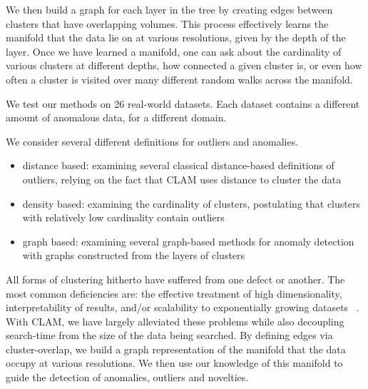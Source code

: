 We then build a graph for each layer in the tree by creating edges between clusters that have overlapping volumes.
This process effectively learns the manifold that the data lie on at various resolutions, given by the depth of the layer.
Once we have learned a manifold, one can ask about the cardinality of various clusters at different depths, how connected a given cluster is, or even how often a cluster is visited over many different random walks across the manifold.

We test our methods on 26 real-world datasets. 
Each dataset contains a different amount of anomalous data, for a different domain.

We consider several different definitions for outliers and anomalies.

\begin{itemize}
    \item distance based: examining several classical distance-based definitions of outliers, relying on the fact that CLAM uses distance to cluster the data
    \item density based: examining the cardinality of clusters, postulating that clusters with relatively low cardinality contain outliers
    \item graph based: examining several graph-based methods for anomaly detection with graphs constructed from the layers of clusters
\end{itemize}

All forms of clustering hitherto have suffered from one defect or another.
The most common deficiencies are: the effective treatment of high dimensionality, interpretability of results, and/or scalability to exponentially growing datasets ~\cite{rakesh_agrawal_automatic_1998}.
With CLAM, we have largely alleviated these problems while also decoupling search-time from the size of the data being searched.
By defining edges via cluster-overlap, we build a graph representation of the manifold that the data occupy at various resolutions.
We then use our knowledge of this manifold to guide the detection of anomalies, outliers and novelties.

